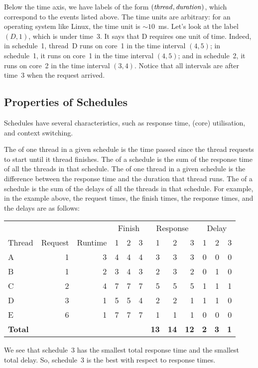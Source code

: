 Below the time axis, we have labels of the form $({\it thread},{\it duration})$,
  which correspond to the events listed above.
The time units are arbitrary:
  for an operating system like Linux, the time unit is $\sim10$~ms.
Let's look at the label $(D,1)$, which is under time~$3$.
It says that D requires one unit of time.
Indeed, in schedule~1, thread~D runs on core~1 in the time interval $(4,5)$;
  in schedule~1, it runs on core~1 in the time interval $(4,5)$;
  and in schedule~2, it runs on core~2 in the time interval $(3,4)$.
Notice that all intervals are after time~$3$ when the request arrived.

\subsection{Properties of Schedules}

Schedules have several characteristics,
  such as response time, (core) utilisation, and context switching.

The  of one thread in a given schedule
  is the time passed since the thread requests to start until it thread finishes.
The  of a schedule
  is the sum of the response time of all the threads in that schedule.
The  of one thread in a given schedule
  is the difference between the response time and the duration that thread runs.
The  of a schedule
  is the sum of the delays of all the threads in that schedule.
For example, in the example above,
  the request times, the finish times, the response times, and the delays
  are as follows:
\begin{center}
\begin{tabular}{@{}lrrrrrrrrrrr@{}}
\toprule
  & & &
  \multicolumn{3}{c}{Finish} &
  \multicolumn{3}{c}{Response} &
  \multicolumn{3}{c}{Delay} 
  \\
    \cmidrule(lr){4-6} \cmidrule(lr){7-9} \cmidrule(l){10-12}
Thread  & Request & Runtime & 1 & 2 & 3 & 1 & 2 & 3 & 1 & 2 & 3 \\
\midrule
A & 1 & 3 & 4 & 4 & 4 & 3 & 3 & 3 & 0 & 0 & 0 \\
B & 1 & 2 & 3 & 4 & 3 & 2 & 3 & 2 & 0 & 1 & 0 \\
C & 2 & 4 & 7 & 7 & 7 & 5 & 5 & 5 & 1 & 1 & 1 \\
D & 3 & 1 & 5 & 5 & 4 & 2 & 2 & 1 & 1 & 1 & 0 \\
E & 6 & 1 & 7 & 7 & 7 & 1 & 1 & 1 & 0 & 0 & 0 \\
{\bf Total} & & & & & & \bf 13 & \bf 14 & \bf 12 & \bf 2 & \bf 3 & \bf 1 \\
\bottomrule
\end{tabular}
\end{center}
We see that schedule~3 has the smallest total response time
  and the smallest total delay.
So, schedule~3 is the best with respect to response times.

